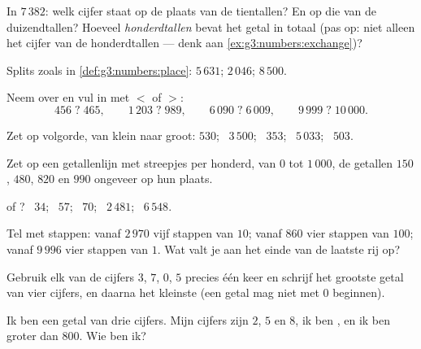 \begin{exercise}[$\star$]\label{exo:g3:numbers:3}
In $7\,382$: welk cijfer staat op de plaats van de tientallen? En op die
van de duizendtallen? Hoeveel \emph{honderdtallen} bevat het getal in
totaal (pas op: niet alleen het cijfer van de honderdtallen --- denk aan
\cref{ex:g3:numbers:exchange})?
\end{exercise}

\begin{exercise}[$\star$]\label{exo:g3:numbers:4}
Splits zoals in \cref{def:g3:numbers:place}:
$5\,631$; \quad $2\,046$; \quad $8\,500$.
\end{exercise}

\begin{exercise}[$\star$]\label{exo:g3:numbers:5}
Neem over en vul in met $<$ of $>$:
\[
456 \;?\; 465, \qquad
1\,203 \;?\; 989, \qquad
6\,090 \;?\; 6\,009, \qquad
9\,999 \;?\; 10\,000 .
\]
\end{exercise}

\begin{exercise}[$\star$]\label{exo:g3:numbers:6}
Zet op volgorde, van klein naar groot: $530$; \ $3\,500$; \ $353$;
\ $5\,033$; \ $503$.
\end{exercise}

\begin{exercise}[$\star$]\label{exo:g3:numbers:7}
Zet op een getallenlijn met streepjes per honderd, van $0$ tot
$1\,000$, de getallen $150$, $480$, $820$ en $990$ ongeveer op hun
plaats.
\end{exercise}

\begin{exercise}[$\star$]\label{exo:g3:numbers:8}
 of ? \ $34$; \ $57$; \ $70$; \ $2\,481$; \ $6\,548$.
\end{exercise}

\begin{exercise}[$\star$]\label{exo:g3:numbers:9}
Tel met stappen: vanaf $2\,970$ vijf stappen van $10$; vanaf $860$ vier
stappen van $100$; vanaf $9\,996$ vier stappen van $1$. Wat valt je aan
het einde van de laatste rij op?
\end{exercise}

\begin{exercise}[$\star\star$]\label{exo:g3:numbers:10}
Gebruik elk van de cijfers $3$, $7$, $0$, $5$ precies één keer en
schrijf het grootste getal van vier cijfers, en daarna het kleinste (een
getal mag niet met $0$ beginnen).
\end{exercise}

\begin{exercise}[$\star\star$]\label{exo:g3:numbers:11}
Ik ben een getal van drie cijfers. Mijn cijfers zijn $2$, $5$ en $8$, ik
ben , en ik ben groter dan $800$. Wie ben ik?
\end{exercise}

